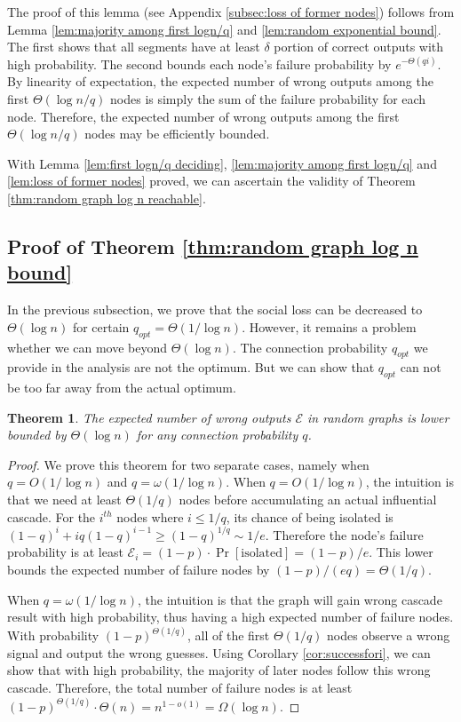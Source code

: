 \documentclass[a4paper,UKenglish]{lipics}
\newtheorem{thm}{Theorem}[section] %
\theoremstyle{definition}
\begin{document}
The proof of this lemma (see Appendix \ref{subsec:loss of former nodes}) follows from Lemma \ref{lem:majority among first logn/q} and \ref{lem:random exponential bound}.
The first shows that all segments have at least $\delta$ portion of correct outputs with high probability.
The second bounds each node's failure probability by $e^{-\Theta(qi)}$.
By linearity of expectation, the expected number of wrong outputs among the first $\Theta(\log n/q)$ nodes 
	is simply the sum of the failure probability for each node. 
Therefore, the expected number of wrong outputs among the first $\Theta(\log n/q)$ nodes may be efficiently bounded.

With Lemma \ref{lem:first logn/q deciding}, \ref{lem:majority among first logn/q} and \ref{lem:loss of former nodes} proved,
	we can ascertain the validity of Theorem \ref{thm:random graph log n reachable}.



\subsection {Proof of Theorem \ref{thm:random graph log n bound}}
In the previous subsection, we prove that the social loss can be decreased to $\Theta(\log n)$ for certain $q_{opt} = \Theta(1 / \log n)$.
However, it remains a problem whether we can move beyond $\Theta(\log n)$.
The connection probability $q_{opt}$ we provide in the analysis are not the optimum.
But we can show that $q_{opt}$ can not be too far away from the actual optimum.
\begin{thm}
The expected number of wrong outputs $\mathcal{E}$ in random graphs is lower bounded by $\Theta(\log n)$ for any connection probability $q$.
\end{thm}
\begin{proof}
We prove this theorem for two separate cases, namely when $q = O(1 / \log n)$ and $q = \omega(1 / \log n)$. 
When $q = O(1 / \log n)$, the intuition is that we need at least $\Theta(1/q)$ nodes before accumulating an actual influential cascade.
For the $i^{th}$ nodes where $i \le 1/q$, its chance of being isolated is 
$
	(1 - q)^{i} + iq(1-q)^{i-1}
\ge
	(1 - q)^{1 / q}
\sim
	{1 / e}.
$
Therefore the node's failure probability is at least $\mathcal{E}_i = (1-p)\cdot\Pr[\text{isolated}] = (1-p)/e$.
This lower bounds the expected number of failure nodes by $(1-p)/(eq) = \Theta(1/q)$.

When $q = \omega(1 / \log n)$, 
	the intuition is that the graph will gain wrong cascade result with high probability,
	thus having a high expected number of failure nodes.
With probability $(1-p)^{\Theta(1/q)}$, all of the first $\Theta(1/q)$ nodes observe a wrong signal and output the wrong guesses.
Using Corollary \ref{cor:successfori}, we can show that with high probability, the majority of later nodes follow this wrong cascade.
Therefore, the total number of failure nodes is at least
$
(1-p)^{\Theta(1/q)}\cdot \Theta(n) = n^{1 - o(1)} = \Omega(\log n).
$
\end{proof}
\end{document}
